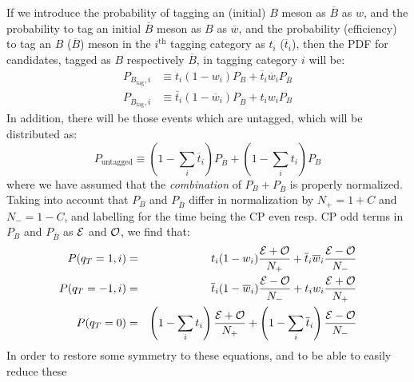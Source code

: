 \documentclass[a4paper,9pt,twoside]{article}
\begin{document}
If we introduce the probability of tagging an (initial) $B$ meson as $\overline{B}$ as $w$, and
the probability to tag an initial $\overline{B}$ meson as $B$ as $\overline{w}$, and the probability
(efficiency) to tag an $B$ ($\overline{B}$) meson in the $i^\mathrm{th}$ tagging category as $t_i$ ($\overline{t}_i$), then the
PDF for candidates, tagged as $B$ respectively $\overline{B}$, in tagging category $i$ will be:
\begin{eqnarray}
   P_{B_\mathrm{tag},i} &\equiv t_i (1-w_i) P_{B} + \overline{t}_i\overline{w}_i P_{\overline{ B} }\\
   P_{\overline{B}_\mathrm{tag},i} &\equiv \overline{t}_i (1-\overline{w}_i) P_{\overline{B}} + t_i w_i P_{ B }
\end{eqnarray} 
In addition, there will be those events which are untagged, which will be distributed as:
\begin{equation}
   P_{\mathrm{untagged}} \equiv \left( 1-\sum_i \overline{t}_i \right)  P_{\overline{B}} + \left( 1 - \sum_i t_i \right)  P_{ B }
\end{equation}
where we have assumed that the {\em combination} of $P_{B}+P_{\overline{B}}$ is properly normalized.
Taking into account that $P_{B}$ and $P_{\overline{B}}$ differ in normalization by
$N_+=1+C$ and $N_-=1-C$, and labelling for the time being the CP even 
resp. CP odd terms in $P_{B}$ and $P_{\overline{B}}$ as ${\cal E}$
and ${\cal O}$, we find that:
\begin{eqnarray}
   P(q_T=1,i) &=& t_i(1-w_i)\frac{{\cal E} + {\cal O}}{N_+} + \overline{t}_i\overline{w}_i\frac{{\cal E}-{\cal O}}{N_-}  \\
   P(q_T=-1,i) &=& \overline{t}_i(1-\overline{w}_i)\frac{{\cal E} - {\cal O}}{N_-} + t_i w_i\frac{{\cal E}+{\cal O}}{N_+} 
   \\ P(q_T=0) &=& \left(1-\sum_i t_i\right)  \frac{ { \cal E } + {\cal O} }{N_+} + \left(1-\sum_i \overline{t}_i\right)  \frac{ { \cal E} - {\cal O} } { N_- }
\end{eqnarray} 
In order to restore some symmetry to these equations, and to be able to easily reduce these
\end{document}
